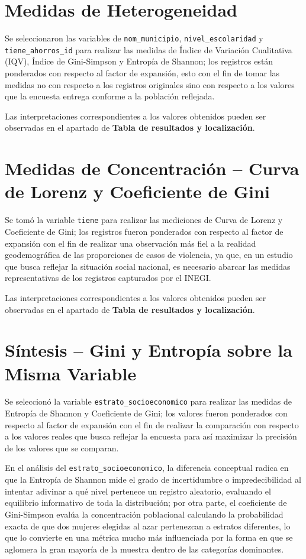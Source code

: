 \documentclass[11pt,a4paper]{article}
\begin{document}
\section{Medidas de Heterogeneidad}
Se seleccionaron las variables de \texttt{nom\_municipio}, \texttt{nivel\_escolaridad} y \texttt{tiene\_ahorros\_id} para realizar las medidas de Índice de Variación Cualitativa (IQV), Índice de Gini-Simpson y Entropía de Shannon; los registros están ponderados con respecto al factor de expansión, esto con el fin de tomar las medidas no con respecto a los registros originales sino con respecto a los valores que la encuesta entrega conforme a la población reflejada.

Las interpretaciones correspondientes a los valores obtenidos pueden ser observadas en el apartado de \textbf{Tabla de resultados y localización}. 

\section{Medidas de Concentración – Curva de Lorenz y Coeficiente de Gini}
Se tomó la variable \texttt{tiene} para realizar las mediciones de Curva de Lorenz y Coeficiente de Gini; los registros fueron ponderados con respecto al factor de expansión con el fin de realizar una observación más fiel a la realidad geodemográfica de las proporciones de casos de violencia, ya que, en un estudio que busca reflejar la situación social nacional, es necesario abarcar las medidas representativas de los registros capturados por el INEGI.

Las interpretaciones correspondientes a los valores obtenidos pueden ser observadas en el apartado de \textbf{Tabla de resultados y localización}. 

\section{Síntesis – Gini y Entropía sobre la Misma Variable}
Se seleccionó la variable \texttt{estrato\_socioeconomico} para realizar las medidas de Entropía de Shannon y Coeficiente de Gini; los valores fueron ponderados con respecto al factor de expansión con el fin de realizar la comparación con respecto a los valores reales que busca reflejar la encuesta para así maximizar la precisión de los valores que se comparan. 

En el análisis del \texttt{estrato\_socioeconomico}, la diferencia conceptual radica en que la Entropía de Shannon mide el grado de incertidumbre o impredecibilidad al intentar adivinar a qué nivel pertenece un registro aleatorio, evaluando el equilibrio informativo de toda la distribución; por otra parte, el coeficiente de Gini-Simpson evalúa la concentración poblacional calculando la probabilidad exacta de que dos mujeres elegidas al azar pertenezcan a estratos diferentes, lo que lo convierte en una métrica mucho más influenciada por la forma en que se aglomera la gran mayoría de la muestra dentro de las categorías dominantes.
\end{document}
